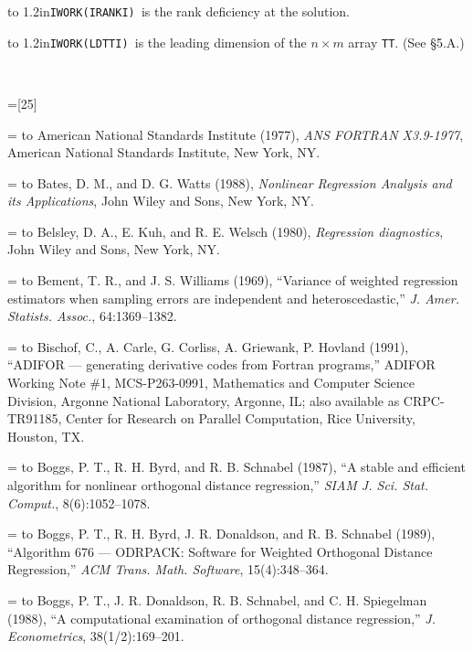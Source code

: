 \hangindent\wd\mybox{}\noindent\hbox to
1.2in{\hfill\tt IWORK(IRANKI) }is the rank deficiency at the solution.\bigskip

\hangindent\wd\mybox{}\noindent\hbox to
1.2in{\hfill\tt IWORK(LDTTI) }is the leading dimension of the $n \times m$ array {\tt TT}. (See \S 5.A.)

\vfil\eject

\ \vskip 1.4in
\def\thissection{Bibliography}
\bigskip\bigskip

\setbox\mybox=\hbox{[25]\ }
\def\ref#1#2{\noindent\hangindent=\wd\mybox{} 
\hbox to \wd\mybox{\hss[#1]\ }#2\medskip}

\ref{1}{American National Standards Institute (1977), {\it ANS FORTRAN X3.9-1977\/}, American National Standards Institute, New York, NY.}

\ref{2}{Bates, D. M., and D. G. Watts (1988), {\it Nonlinear Regression Analysis and its Applications\/}, John Wiley and Sons, New York, NY.}

\ref{3}{Belsley, D. A., E. Kuh, and R. E. Welsch (1980), {\it Regression diagnostics\/}, John Wiley and Sons, New York, NY.}

\ref{4}{Bement, T. R., and J. S. Williams (1969), ``Variance of weighted regression estimators when sampling errors are independent and heteroscedastic,'' {\it J. Amer. Statists. Assoc.\/}, 64:1369--1382.}

\ref{5}{Bischof, C., A. Carle, G. Corliss, A. Griewank, P. Hovland (1991), ``ADIFOR --- generating derivative codes from Fortran programs,'' ADIFOR Working Note \#1, MCS-P263-0991, Mathematics and Computer Science Division, Argonne National Laboratory, Argonne, IL; also available as CRPC-TR91185, Center for Research on Parallel Computation, Rice University, Houston, TX.}

\ref{6}{Boggs, P. T., R. H. Byrd, and R. B. Schnabel (1987), ``A stable and efficient algorithm for nonlinear orthogonal distance regression,'' {\it SIAM J. Sci. Stat. Comput.\/}, 8(6):1052--1078.}

\ref{7}{Boggs, P. T., R. H. Byrd, J. R. Donaldson, and R. B. Schnabel (1989), ``Algorithm 676 --- ODRPACK: Software for Weighted Orthogonal Distance Regression,'' {\it ACM Trans. Math. Software\/}, 15(4):348--364.}

\ref{8}{Boggs, P. T., J. R. Donaldson, R. B. Schnabel, and C. H. Spiegelman (1988), ``A computational examination of orthogonal distance regression,'' {\it J. Econometrics\/}, 38(1/2):169--201.}

